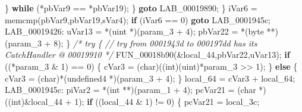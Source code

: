 \documentclass[
]{article}
\newenvironment{Shaded}{}{}
\newcommand{\CommentTok}[1]{\textcolor[rgb]{0.38,0.63,0.69}{\textit{#1}}}
\newcommand{\ControlFlowTok}[1]{\textcolor[rgb]{0.00,0.44,0.13}{\textbf{#1}}}
\newcommand{\DataTypeTok}[1]{\textcolor[rgb]{0.56,0.13,0.00}{#1}}
\newcommand{\DecValTok}[1]{\textcolor[rgb]{0.25,0.63,0.44}{#1}}
\newcommand{\NormalTok}[1]{#1}
\newcommand{\OperatorTok}[1]{\textcolor[rgb]{0.40,0.40,0.40}{#1}}
\begin{document}
\begin{Shaded}
\begin{Highlighting}[]
        \OperatorTok{\}} \ControlFlowTok{while} \OperatorTok{(*}\NormalTok{pbVar9 }\OperatorTok{==} \OperatorTok{*}\NormalTok{pbVar19}\OperatorTok{);}
      \OperatorTok{\}}
      \ControlFlowTok{goto}\NormalTok{ LAB\_00019890}\OperatorTok{;}
    \OperatorTok{\}}
\NormalTok{    iVar6 }\OperatorTok{=}\NormalTok{ memcmp}\OperatorTok{(}\NormalTok{pbVar9}\OperatorTok{,}\NormalTok{pbVar19}\OperatorTok{,}\NormalTok{sVar4}\OperatorTok{);}
    \ControlFlowTok{if} \OperatorTok{(}\NormalTok{iVar6 }\OperatorTok{==} \DecValTok{0}\OperatorTok{)} \ControlFlowTok{goto}\NormalTok{ LAB\_0001945c}\OperatorTok{;}
\NormalTok{LAB\_00019426}\OperatorTok{:}
\NormalTok{    uVar13 }\OperatorTok{=} \OperatorTok{*(}\NormalTok{uint }\OperatorTok{*)(}\NormalTok{param\_3 }\OperatorTok{+} \DecValTok{4}\OperatorTok{);}
\NormalTok{    pbVar22 }\OperatorTok{=} \OperatorTok{*(}\NormalTok{byte }\OperatorTok{**)(}\NormalTok{param\_3 }\OperatorTok{+} \DecValTok{8}\OperatorTok{);}
  \OperatorTok{\}}
                    \CommentTok{/* try \{ // try from 0001943d to 000197dd has its CatchHandler @ 00019910 */}
\NormalTok{  FUN\_00018b90}\OperatorTok{(\&}\NormalTok{local\_44}\OperatorTok{,}\NormalTok{pbVar22}\OperatorTok{,}\NormalTok{uVar13}\OperatorTok{);}
  \ControlFlowTok{if} \OperatorTok{((*}\NormalTok{param\_3 }\OperatorTok{\&} \DecValTok{1}\OperatorTok{)} \OperatorTok{==} \DecValTok{0}\OperatorTok{)} \OperatorTok{\{}
\NormalTok{    cVar3 }\OperatorTok{=} \OperatorTok{(}\DataTypeTok{char}\OperatorTok{)((}\DataTypeTok{int}\OperatorTok{)(}\NormalTok{uint}\OperatorTok{)*}\NormalTok{param\_3 }\OperatorTok{\textgreater{}\textgreater{}} \DecValTok{1}\OperatorTok{);}
  \OperatorTok{\}}
  \ControlFlowTok{else} \OperatorTok{\{}
\NormalTok{    cVar3 }\OperatorTok{=} \OperatorTok{(}\DataTypeTok{char}\OperatorTok{)*(}\NormalTok{undefined4 }\OperatorTok{*)(}\NormalTok{param\_3 }\OperatorTok{+} \DecValTok{4}\OperatorTok{);}
  \OperatorTok{\}}
\NormalTok{  local\_64 }\OperatorTok{=}\NormalTok{ cVar3 }\OperatorTok{+}\NormalTok{ local\_64}\OperatorTok{;}
\NormalTok{LAB\_0001945c}\OperatorTok{:}
\NormalTok{  piVar2 }\OperatorTok{=} \OperatorTok{*(}\DataTypeTok{int} \OperatorTok{**)(}\NormalTok{param\_1 }\OperatorTok{+} \DecValTok{4}\OperatorTok{);}
\NormalTok{  pcVar21 }\OperatorTok{=} \OperatorTok{(}\DataTypeTok{char} \OperatorTok{*)((}\DataTypeTok{int}\OperatorTok{)\&}\NormalTok{local\_44 }\OperatorTok{+} \DecValTok{1}\OperatorTok{);}
  \ControlFlowTok{if} \OperatorTok{((}\NormalTok{local\_44 }\OperatorTok{\&} \DecValTok{1}\OperatorTok{)} \OperatorTok{!=} \DecValTok{0}\OperatorTok{)} \OperatorTok{\{}
\NormalTok{    pcVar21 }\OperatorTok{=}\NormalTok{ local\_3c}\OperatorTok{;}

\end{Highlighting}
\end{Shaded}
\end{document}
